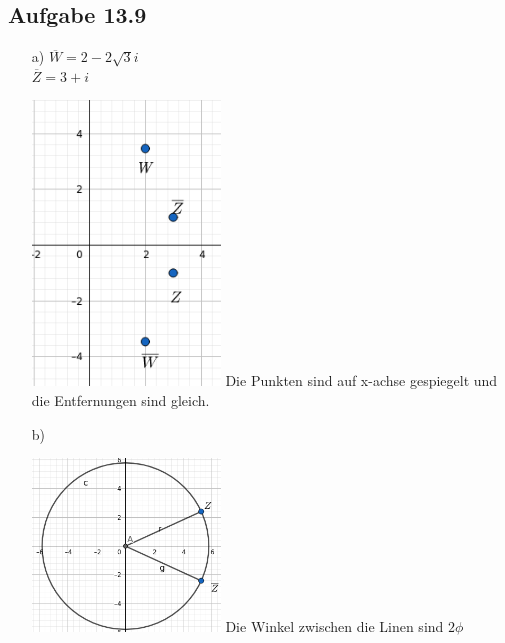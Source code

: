 \documentclass{standalone}
\begin{document}
\subsection{Aufgabe 13.9}
\begin{itemize}
	\item[a)]
$\overline{W} = 2-2\sqrt{3} i$\\
$\overline{Z} = 3+i$\\
    \begin{center}
	\includegraphics[width=5cm]{img/13_9_a.png}
	Die Punkten sind auf x-achse gespiegelt und die Entfernungen sind gleich.\\
\end{center}

	\item[b)]
	\begin{center}
		\includegraphics[width=5cm]{img/13_9_b.png}
		Die Winkel zwischen die Linen sind $2\phi$\\
	\end{center}

\end{itemize}
\end{document}
